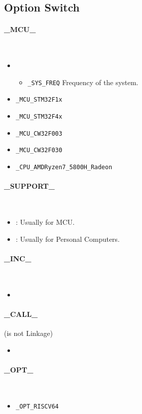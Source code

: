 \subsection{Option Switch}

\paragraph{\_MCU\_} \
\begin{itemize}
	\item {}\begin{itemize}
		\item \verb`_SYS_FREQ` Frequency of the system.
	\end{itemize}
	\item \verb`_MCU_STM32F1x`
	\item \verb`_MCU_STM32F4x`
	\item \verb`_MCU_CW32F003`
	\item \verb`_MCU_CW32F030`
	\item \verb`_CPU_AMDRyzen7_5800H_Radeon`
\end{itemize}

\paragraph{\_SUPPORT\_} \
\begin{itemize}
	\item {}: Usually for MCU.
	\item {}: Usually for Personal Computers.
\end{itemize}

\paragraph{\_INC\_} \
\begin{itemize}
	\item%
\end{itemize}

\paragraph{\_CALL\_} (is not Linkage) \
\begin{itemize}
	\item%
\end{itemize}

\paragraph{\_OPT\_} \
\begin{itemize}
	\item \verb`_OPT_RISCV64`
\end{itemize}

